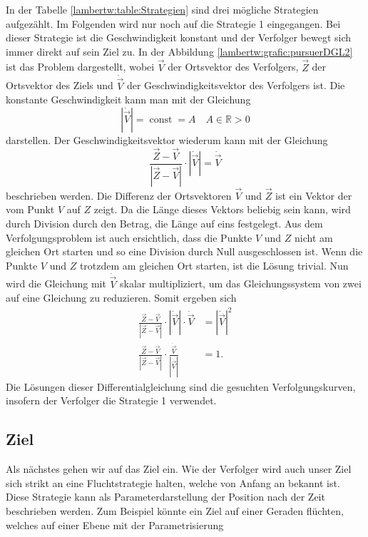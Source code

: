 In der Tabelle \eqref{lambertw:table:Strategien} sind drei mögliche Strategien aufgezählt.
Im Folgenden wird nur noch auf die Strategie 1 eingegangen.
Bei dieser Strategie ist die Geschwindigkeit konstant und der Verfolger bewegt sich immer direkt auf sein Ziel zu.
In der Abbildung \eqref{lambertw:grafic:pursuerDGL2} ist das Problem dargestellt,
wobei $\vec{V}$ der Ortsvektor des Verfolgers, $\vec{Z}$ der Ortsvektor des Ziels und $\dot{\vec{V}}$ der Geschwindigkeitsvektor des Verfolgers ist.
Die konstante Geschwindigkeit kann man mit der Gleichung
\begin{equation}
    |\dot{\vec{V}}|
    = \operatorname{const} = A
    \quad A\in\mathbb{R}>0
\end{equation}
darstellen. Der Geschwindigkeitsvektor wiederum kann mit der Gleichung
\begin{equation}
    \frac{\vec{Z}-\vec{V}}{|\vec{Z}-\vec{V}|}\cdot|\dot{\vec{V}}|
    =
    \dot{\vec{V}}
\end{equation}
beschrieben werden.
Die Differenz der Ortsvektoren $\vec{V}$ und $\vec{Z}$ ist ein Vektor der vom Punkt $V$ auf $Z$ zeigt.
Da die Länge dieses Vektors beliebig sein kann, wird durch Division durch den Betrag, die Länge auf eins festgelegt.
Aus dem Verfolgungsproblem ist auch ersichtlich, dass die Punkte $V$ und $Z$ nicht am gleichen Ort starten und so eine Division durch Null ausgeschlossen ist.
Wenn die Punkte $V$ und $Z$ trotzdem am gleichen Ort starten, ist die Lösung trivial.
Nun wird die Gleichung mit $\dot{\vec{V}}$ skalar multipliziert, um das Gleichungssystem von zwei auf eine Gleichung zu reduzieren. Somit ergeben sich
\begin{align}
    \frac{\vec{Z}-\vec{V}}{|\vec{Z}-\vec{V}|}\cdot|\dot{\vec{V}}|\cdot\dot{\vec{V}}
    &=
    |\dot{\vec{V}}|^2
    \\
    \label{lambertw:pursuerDGL}
    \frac{\vec{Z}-\vec{V}}{|\vec{Z}-\vec{V}|}\cdot \frac{\dot{\vec{V}}}{|\dot{\vec{V}}|}
    &=
    1 \text{.}
\end{align}
Die Lösungen dieser Differentialgleichung sind die gesuchten Verfolgungskurven, insofern der Verfolger die Strategie 1 verwendet.

\subsection{Ziel
\label{lambertw:subsection:Ziel}}
Als nächstes gehen wir auf das Ziel ein.
Wie der Verfolger wird auch unser Ziel sich strikt an eine Fluchtstrategie halten, welche von Anfang an bekannt ist.
Diese Strategie kann als Parameterdarstellung der Position nach der Zeit beschrieben werden.
Zum Beispiel könnte ein Ziel auf einer Geraden flüchten, welches auf einer Ebene mit der Parametrisierung

